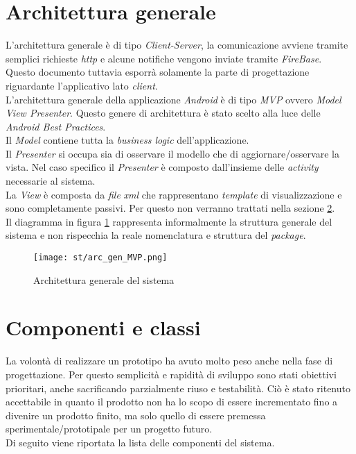 \newpage
\section{Architettura generale}
L'architettura generale è di tipo \emph{Client-Server}, la comunicazione avviene tramite semplici richieste \emph{http} e alcune notifiche vengono inviate tramite \emph{FireBase}.\\
Questo documento tuttavia esporrà solamente la parte di progettazione riguardante l'applicativo lato \emph{client}.\\
L'architettura generale della applicazione \emph{Android} è di tipo \emph{MVP} ovvero \emph{Model View Presenter}. Questo genere di architettura è stato scelto alla luce delle \emph{Android Best Practices}.\\
Il \emph{Model} contiene tutta la \emph{business logic} dell'applicazione.\\
Il \emph{Presenter} si occupa sia di osservare il modello che di aggiornare/osservare la vista. Nel caso specifico il \emph{Presenter} è composto dall'insieme delle \emph{activity} necessarie al sistema.\\
La \emph{View} è composta da \emph{file} \emph{xml} che rappresentano \emph{template} di visualizzazione e sono completamente passivi. Per questo non verranno trattati nella sezione \ref{cap:componenti-classi}.\\
Il diagramma in figura \ref{fig:arc_generale} rappresenta informalmente la struttura generale del sistema e non rispecchia la reale nomenclatura e struttura del \emph{package}.
\begin{figure}[H] 
    \centering 
    \texttt{[image: st/arc\_gen\_MVP.png]} 
    \caption{Architettura generale del sistema}\label{fig:arc_generale}
\end{figure}



\section{Componenti e classi}\label{cap:componenti-classi}
La volontà di realizzare un prototipo ha avuto molto peso anche nella fase di progettazione. Per questo semplicità e rapidità di sviluppo sono stati obiettivi prioritari, anche sacrificando parzialmente riuso e testabilità. Ciò è stato ritenuto accettabile in quanto il prodotto non ha lo scopo di essere incrementato fino a divenire un prodotto finito, ma solo quello di essere premessa sperimentale/prototipale per un progetto futuro.\\
Di seguito viene riportata la lista delle componenti del sistema.

